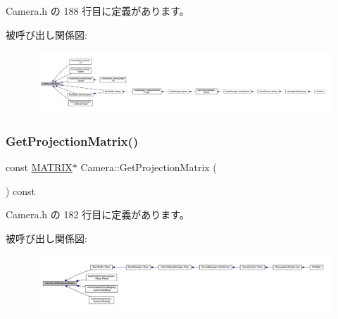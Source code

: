  Camera.\+h の 188 行目に定義があります。

被呼び出し関係図\+:
\nopagebreak
\begin{figure}[H]
\begin{center}
\leavevmode
\includegraphics[width=350pt]{class_camera_a18f380bd6b2c42162c8fcf7e4441a355_icgraph}
\end{center}
\end{figure}
\mbox{\label{class_camera_a473a7a8408bc7a1fdd46d12fa3852846}} 
\subsubsection{\texorpdfstring{Get\+Projection\+Matrix()}{GetProjectionMatrix()}}
{\footnotesize\ttfamily const \mbox{\hyperlink{_vector3_d_8h_a032295cd9fb1b711757c90667278e744}{M\+A\+T\+R\+IX}}$\ast$ Camera\+::\+Get\+Projection\+Matrix (\begin{DoxyParamCaption}{ }\end{DoxyParamCaption}) const\hspace{0.3cm}{\ttfamily [inline]}}



 Camera.\+h の 182 行目に定義があります。

被呼び出し関係図\+:
\nopagebreak
\begin{figure}[H]
\begin{center}
\leavevmode
\includegraphics[width=350pt]{class_camera_a473a7a8408bc7a1fdd46d12fa3852846_icgraph}
\end{center}
\end{figure}
\mbox{\label{class_camera_a3bda45b352bfa163c306c638a2aee1f6}} 
